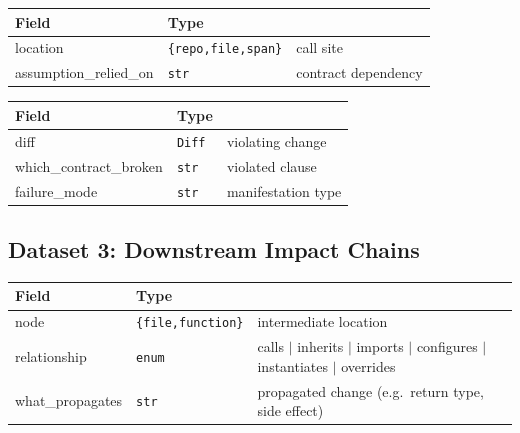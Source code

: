 \documentclass[a4paper,12pt]{article}
\begin{document}
\begin{tcolorbox}[title=Consumer]
\footnotesize
\begin{tabularx}{\linewidth}{@{} l l Y @{}}
\toprule
\textbf{Field} & \textbf{Type} & \\
\midrule
location & \texttt{\{repo,file,span\}} & call site \\
assumption\_relied\_on & \texttt{str} & contract dependency \\
\bottomrule
\end{tabularx}
\end{tcolorbox}

\begin{tcolorbox}[title=KnownViolation]
\footnotesize
\begin{tabularx}{\linewidth}{@{} l l Y @{}}
\toprule
\textbf{Field} & \textbf{Type} & \\
\midrule
diff & \texttt{Diff} & violating change \\
which\_contract\_broken & \texttt{str} & violated clause \\
failure\_mode & \texttt{str} & manifestation type \\
\bottomrule
\end{tabularx}
\end{tcolorbox}

\subsection{Dataset 3: Downstream Impact Chains}

\begin{tcolorbox}[title=CausalNode]
\footnotesize
\begin{tabularx}{\linewidth}{@{} l l Y @{}}
\toprule
\textbf{Field} & \textbf{Type} & \\
\midrule
node & \texttt{\{file,function\}} & intermediate location \\
relationship & \texttt{enum} & calls $\mid$ inherits $\mid$ imports $\mid$ configures $\mid$ instantiates $\mid$ overrides \\
what\_propagates & \texttt{str} & propagated change (e.g.\ return type, side effect) \\
\bottomrule
\end{tabularx}
\end{tcolorbox}

\end{document}
